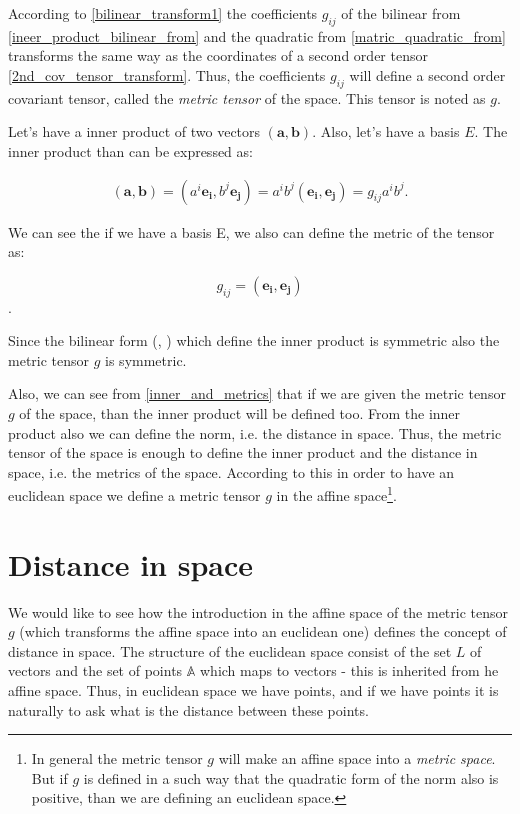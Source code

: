 \documentclass{book}
\begin{document}
According to \eqref{bilinear_transform1} the coefficients $g_{ij}$ of the bilinear from \eqref{ineer_product_bilinear_from} and the quadratic from \eqref{matric_quadratic_from} transforms the same way as the coordinates of a second order tensor \eqref{2nd_cov_tensor_transform}. Thus, the coefficients $g_{ij}$ will define a second order covariant tensor, called the \emph{metric tensor} of the space. This tensor is noted as $g$.

Let's have a inner product of two vectors $(\boldsymbol{a}, \boldsymbol{b})$. Also, let's have a basis $E$. The inner product than can be expressed as:

\begin{align}
(\boldsymbol{a}, \boldsymbol{b}) = (a^i \boldsymbol{e_i}, b^j\boldsymbol{e_j}) = a^{i}b^{j} (\boldsymbol{e_i}, \boldsymbol{e_j}) = g_{ij} a^{i}b^{j}. \label{inner_and_metrics}
\end{align}

We can see the if we have a basis E, we also can define the metric of the tensor as:

\[g_{ij} = (\boldsymbol{e_i}, \boldsymbol{e_j})\].

Since the bilinear form (, ) which define the inner product is symmetric also the metric tensor $g$ is symmetric.

Also, we can see from \eqref{inner_and_metrics} that if we are given the metric tensor $g$ of the space, than the inner product will be defined too. From the inner product also we can define the norm, i.e. the distance in space. Thus, the metric tensor of the space is enough to define the inner product and the distance in space, i.e. the metrics of the space. According to this in order to have an euclidean space we define a metric tensor $g$ in the affine space\footnote{In general the metric tensor $g$ will make an affine space into a \emph{metric space}. But if $g$ is defined in a such way that the quadratic form of the norm also is positive, than we are defining an euclidean space.}.

\section{Distance in space}

We would like to see how the introduction in the affine space of the metric tensor $g$ (which transforms the affine space into an euclidean one) defines the concept of distance in space. The structure of the euclidean space consist of the set $L$ of vectors and the set of points $\mathbb{A}$ which maps to vectors - this is inherited from he affine space. Thus, in euclidean space we have points, and if we have points it is naturally to ask what is the distance between these points.
\end{document}
